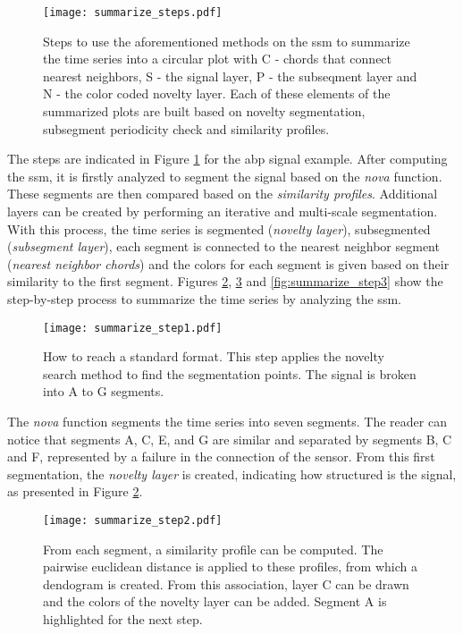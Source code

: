 {\begin{figure}
\centering
\texttt{[image: summarize\_steps.pdf]}
\caption{Steps to use the aforementioned methods on the \gls{ssm} to summarize the time series into a circular plot with C - chords that connect nearest neighbors, S - the signal layer, P - the subseqment layer and N - the color coded novelty layer. Each of these elements of the summarized plots are built based on novelty segmentation, subsegment periodicity check and similarity profiles.}
\label{fig:summarize_steps}
\end{figure}

The steps are indicated in Figure \ref{fig:summarize_steps} for the \gls{abp} signal example. After computing the \gls{ssm}, it is firstly analyzed to segment the signal based on the \textit{nova} function. These segments are then compared based on the \textit{similarity profiles}. Additional layers can be created by performing an iterative and multi-scale segmentation. With this process, the time series is segmented (\textit{novelty layer}), subsegmented (\textit{subsegment layer}), each segment is connected to the nearest neighbor segment (\textit{nearest neighbor chords}) and the colors for each segment is given based on their similarity to the first segment. Figures \ref{fig:summarize_step1}, \ref{fig:summarize_step2} and \ref{fig:summarize_step3} show the step-by-step process to summarize the time series by analyzing the \gls{ssm}. 

\begin{figure}
\centering
\texttt{[image: summarize\_step1.pdf]}
\caption{How to reach a standard format. This step applies the novelty search method to find the segmentation points. The signal is broken into A to G segments.}
\label{fig:summarize_step1}
\end{figure}

The \textit{nova} function segments the time series into seven segments. The reader can notice that segments A, C, E, and G are similar and separated by segments B, C and F, represented by a failure in the connection of the sensor. From this first segmentation, the \textit{novelty layer} is created, indicating how structured is the signal, as presented in Figure \ref{fig:summarize_step1}.

\begin{figure}[b]
\centering
\texttt{[image: summarize\_step2.pdf]}
\caption{From each segment, a similarity profile can be computed. The pairwise euclidean distance is applied to these profiles, from which a dendogram is created. From this association, layer C can be drawn and the colors of the novelty layer can be added. Segment A is highlighted for the next step.}
\label{fig:summarize_step2}
\end{figure}

}
